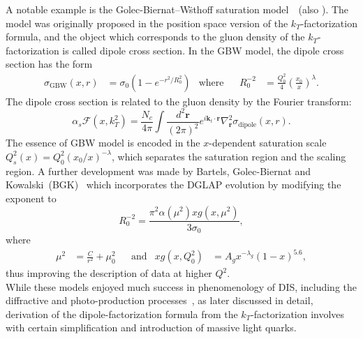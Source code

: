 \documentclass[11pt]{article}
\numberwithin{equation}{section}
\numberwithin{table}{section}
\numberwithin{figure}{section}
\newcommand{\comment}[1]{\texttt{\color{red}#1}}
\begin{document}
A notable example is the Golec-Biernat--W\"sthoff saturation model~\cite{Golec-Biernat:1998zce}~(also \cite{Kowalski:2003hm,McLerran:1993ni,Forshaw:1999uf,Iancu:2003ge}). The model was originally proposed in the position space version of the $k_T$-factorization formula, and the object which corresponds to the gluon density of the $k_T$-factorization is called dipole cross section.
In the GBW model, the dipole cross section has the form~\cite{Golec-Biernat:1998zce}
\begin{align}
\sigma_{\mathrm{GBW}}(x,r)&=\sigma_0\left(1-e^{-r^2/R^2_0}\right)&\mathrm{where}&
&R^{-2}_0&=\frac{Q_0^{2}}{4}\left(\frac{x_0}{x}\right)^\lambda.
\end{align}
The dipole cross section is related to the gluon density by the Fourier transform: 
\begin{equation}
\alpha_s\mathcal{F}(x,k_T^2)=\frac{N_c}{4\pi}\int\frac{d^2\mathbf{r}}{(2\pi)^2}e^{i\mathbf{k}_t\cdot \mathbf{r} }\nabla_{\mathbf{r}}^2\sigma_{\mathrm{dipole}}(x,r).
\label{eq:dipole-gluon}
\end{equation}
The essence of GBW model is encoded in the $x$-dependent saturation scale $Q_s^2(x)=Q^2_0(x_0/x)^{-\lambda}$, which separates the saturation region and the scaling region.
A further development was made by Bartels, Golec-Biernat and Kowalski~(BGK)~\cite{Bartels:2002cj} which incorporates the DGLAP evolution by modifying the exponent to 
\begin{equation}
R_0^{-2}=\frac{\pi^2\alpha(\mu^2)xg(x,\mu^2)}{3\sigma_0},
\end{equation}
where
\begin{align}
\mu^2&=\frac{C}{r^2}+\mu_0^2 & &\mathrm{and} & xg(x,Q^2_0)&=A_g x^{-\lambda_g}(1-x)^{5.6},
\end{align}
thus improving the description of data at higher $Q^2$.\\
While these models enjoyed much success in phenomenology of DIS, including the diffractive and photo-production processes~\cite{Golec-Biernat:1998zce,Golec-Biernat:1999qor}, as later discussed in detail, derivation of the dipole-factorization formula from the $k_T$-factorization involves with certain simplification and introduction of massive light quarks. 
\end{document}
